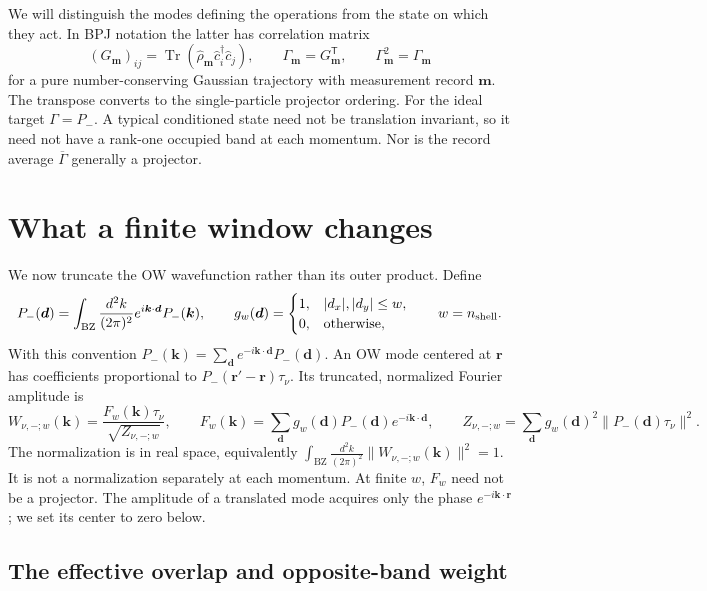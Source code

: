 \documentclass[aps,prb,onecolumn,nofootinbib,superscriptaddress]{revtex4-2}
\newcommand{\Tr}{\operatorname{Tr}}
\newcommand{\bk}{\boldsymbol k}
\newcommand{\br}{\boldsymbol r}
\newcommand{\bd}{\boldsymbol d}
\newcommand{\rec}{\boldsymbol m}
\newcommand{\intk}{\int_{\mathrm{BZ}}\frac{d^2k}{(2\pi)^2}}
\begin{document}
We will distinguish the modes defining the operations from the state on which
they act. In BPJ notation the latter has correlation matrix
\begin{equation}
 (G_{\rec})_{ij}=\Tr(\hat\rho_{\rec}\hat c_i^\dagger\hat c_j),
 \qquad \Gamma_{\rec}=G_{\rec}^{\mathsf T},\qquad
 \Gamma_{\rec}^2=\Gamma_{\rec}
 \label{eq:trajectory}
\end{equation}
for a pure number-conserving Gaussian trajectory with measurement record
$\rec$. The transpose converts to the single-particle projector ordering.
For the ideal target $\Gamma=P_-$. A typical conditioned state need not be
translation invariant, so it need not have a rank-one occupied band at each
momentum. Nor is the record average $\overline\Gamma$ generally a projector.

\section{What a finite window changes}
\label{sec:window}

We now truncate the OW wavefunction rather than its outer product. Define
\begin{equation}
 P_-(\bd)=\intk e^{i\bk\cdot\bd}P_-(\bk),\qquad
 g_w(\bd)=\begin{cases}1,&|d_x|,|d_y|\le w,\\0,&\text{otherwise},\end{cases}
 \qquad w=n_{\rm shell}.
 \label{eq:fourier}
\end{equation}
With this convention $P_-(\bk)=\sum_{\bd}e^{-i\bk\cdot\bd}P_-(\bd)$.
An OW mode centered at $\br$ has coefficients proportional to
$P_-(\br'-\br)\tau_\nu$. Its truncated, normalized Fourier amplitude is
\begin{equation}
 W_{\nu,-;w}(\bk)=\frac{F_w(\bk)\tau_\nu}{\sqrt{Z_{\nu,-;w}}},\qquad
 F_w(\bk)=\sum_{\bd}g_w(\bd)P_-(\bd)e^{-i\bk\cdot\bd},\qquad
 Z_{\nu,-;w}=\sum_{\bd}g_w(\bd)^2\|P_-(\bd)\tau_\nu\|^2.
 \label{eq:truncated}
\end{equation}
The normalization is in real space, equivalently
$\intk\|W_{\nu,-;w}(\bk)\|^2=1$. It is not a normalization separately at
each momentum. At finite $w$, $F_w$ need not be a projector.
The amplitude of a translated mode acquires only the phase
$e^{-i\bk\cdot\br}$; we set its center to zero below.

\subsection{The effective overlap and opposite-band weight}
\end{document}
